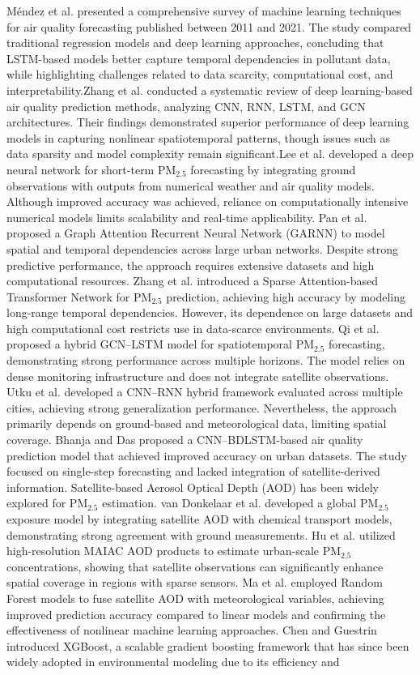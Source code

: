 \documentclass[conference]{IEEEtran}
\begin{document}
Méndez et al. \cite{b1} presented a comprehensive survey of machine learning techniques for air quality forecasting published between 2011 and 2021. The study compared traditional regression models and deep learning approaches, concluding that LSTM-based models better capture temporal dependencies in pollutant data, while highlighting challenges related to data scarcity, computational cost, and interpretability.Zhang et al. \cite{b2} conducted a systematic review of deep learning-based air quality prediction methods, analyzing CNN, RNN, LSTM, and GCN architectures. Their findings demonstrated superior performance of deep learning models in capturing nonlinear spatiotemporal patterns, though issues such as data sparsity and model complexity remain significant.Lee et al. \cite{b3} developed a deep neural network for short-term PM$_{2.5}$ forecasting by integrating ground observations with outputs from numerical weather and air quality models. Although improved accuracy was achieved, reliance on computationally intensive numerical models limits scalability and real-time applicability. Pan et al. \cite{b4} proposed a Graph Attention Recurrent Neural Network (GARNN) to model spatial and temporal dependencies across large urban networks. Despite strong predictive performance, the approach requires extensive datasets and high computational resources. Zhang et al. \cite{b5} introduced a Sparse Attention-based Transformer Network for PM$_{2.5}$ prediction, achieving high accuracy by modeling long-range temporal dependencies. However, its dependence on large datasets and high computational cost restricts use in data-scarce environments. Qi et al. \cite{b6} proposed a hybrid GCN–LSTM model for spatiotemporal PM$_{2.5}$ forecasting, demonstrating strong performance across multiple horizons. The model relies on dense monitoring infrastructure and does not integrate satellite observations. Utku et al. \cite{b7} developed a CNN–RNN hybrid framework evaluated across multiple cities, achieving strong generalization performance. Nevertheless, the approach primarily depends on ground-based and meteorological data, limiting spatial coverage. Bhanja and Das \cite{b8} proposed a CNN–BDLSTM-based air quality prediction model that achieved improved accuracy on urban datasets. The study focused on single-step forecasting and lacked integration of satellite-derived information. Satellite-based Aerosol Optical Depth (AOD) has been widely explored for PM$_{2.5}$ estimation. van Donkelaar et al. \cite{b9} developed a global PM$_{2.5}$ exposure model by integrating satellite AOD with chemical transport models, demonstrating strong agreement with ground measurements. Hu et al. \cite{b10} utilized high-resolution MAIAC AOD products to estimate urban-scale PM$_{2.5}$ concentrations, showing that satellite observations can significantly enhance spatial coverage in regions with sparse sensors. Ma et al. \cite{b11} employed Random Forest models to fuse satellite AOD with meteorological variables, achieving improved prediction accuracy compared to linear models and confirming the effectiveness of nonlinear machine learning approaches. Chen and Guestrin \cite{b12} introduced XGBoost, a scalable gradient boosting framework that has since been widely adopted in environmental modeling due to its efficiency and 
\end{document}
